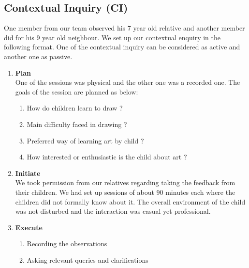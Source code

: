\documentclass{scrreprt}
\begin{document}
\subsection{Contextual Inquiry (CI)}
\vspace{-2pt}
One member from our team observed his 7 year old relative and another member did for his 9 year old neighbour. We set up our contextual enquiry in the following format. One of the contextual inquiry can be considered as active and another one as passive.
\vspace{-2pt}
\begin{enumerate}[itemsep=0.5pt]
    \item \textbf{Plan} \\ 
     One of the sessions was physical and the other one was a recorded one.
     The goals of the session are planned as below:
    \begin{enumerate}[itemsep=0.5pt]
        \item How do children learn to draw ?
        \item Main difficulty faced in drawing ?
        \item Preferred way of learning art by child ?
        \item How interested or enthusiastic is the child about art ?
    \end{enumerate}
    
    \item \textbf{Initiate} \\
    We took permission from our relatives regarding taking the feedback from their children. We had set up sessions of about 90 minutes each where the children did not formally know about it. The overall environment of the child was not disturbed and the interaction was casual yet professional.
    
    \item \textbf{Execute}
    \begin{enumerate}[itemsep=0.5pt]
        \item Recording the observations
        \item Asking relevant queries and clarifications
    \end{enumerate}
    

\end{enumerate}
\end{document}
